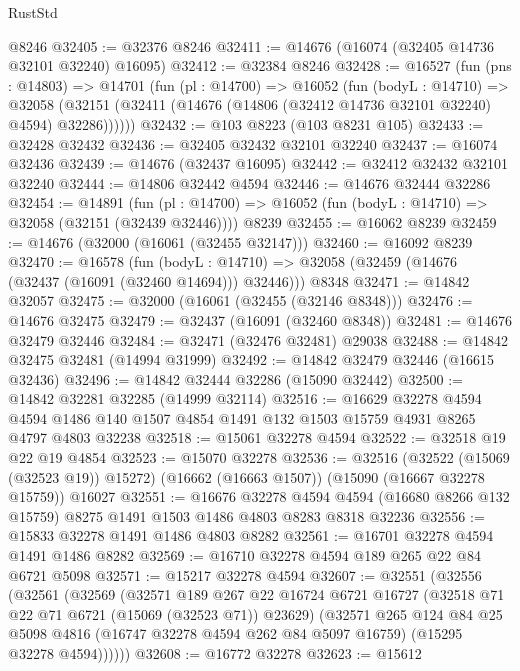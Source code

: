 \begin{lexlean}{RustStd}
\begin{coremodule}
    @8246
@32405 := @32376 @8246
@32411 := @14676 (@16074 (@32405 @14736 @32101 @32240) @16095)
@32412 := @32384 @8246
@32428 := @16527
    (fun (pns : @14803) =>
    @14701
      (fun (pl : @14700) =>
      @16052
        (fun (bodyL : @14710) =>
        @32058 (@32151 (@32411 (@14676 (@14806 (@32412 @14736 @32101 @32240) @4594) @32286))))))
@32432 := @103 @8223 (@103 @8231 @105)
@32433 := @32428 @32432
@32436 := @32405 @32432 @32101 @32240
@32437 := @16074 @32436
@32439 := @14676 (@32437 @16095)
@32442 := @32412 @32432 @32101 @32240
@32444 := @14806 @32442 @4594
@32446 := @14676 @32444 @32286
@32454 := @14891
    (fun (pl : @14700) => @16052 (fun (bodyL : @14710) => @32058 (@32151 (@32439 @32446))))
    @8239
@32455 := @16062 @8239
@32459 := @14676 (@32000 (@16061 (@32455 @32147)))
@32460 := @16092 @8239
@32470 := @16578
    (fun (bodyL : @14710) => @32058 (@32459 (@14676 (@32437 (@16091 (@32460 @14694))) @32446)))
    @8348
@32471 := @14842 @32057
@32475 := @32000 (@16061 (@32455 (@32146 @8348)))
@32476 := @14676 @32475
@32479 := @32437 (@16091 (@32460 @8348))
@32481 := @14676 @32479 @32446
@32484 := @32471 (@32476 @32481) @29038
@32488 := @14842 @32475 @32481 (@14994 @31999)
@32492 := @14842 @32479 @32446 (@16615 @32436)
@32496 := @14842 @32444 @32286 (@15090 @32442)
@32500 := @14842 @32281 @32285 (@14999 @32114)
@32516 := @16629
    @32278
    @4594
    @4594
    @1486
    @140
    @1507
    @4854
    @1491
    @132
    @1503
    @15759
    @4931
    @8265
    @4797
    @4803
    @32238
@32518 := @15061 @32278 @4594
@32522 := @32518 @19 @22 @19 @4854
@32523 := @15070 @32278
@32536 := @32516
    (@32522 (@15069 (@32523 @19)) @15272)
    (@16662 (@16663 @1507))
    (@15090 (@16667 @32278 @15759))
    @16027
@32551 := @16676
    @32278
    @4594
    @4594
    (@16680 @8266 @132 @15759)
    @8275
    @1491
    @1503
    @1486
    @4803
    @8283
    @8318
    @32236
@32556 := @15833 @32278 @1491 @1486 @4803 @8282
@32561 := @16701 @32278 @4594 @1491 @1486 @8282
@32569 := @16710 @32278 @4594 @189 @265 @22 @84 @6721 @5098
@32571 := @15217 @32278 @4594
@32607 := @32551
    (@32556
      (@32561
        (@32569
          (@32571
            @189
            @267
            @22
            @16724
            @6721
            @16727
            (@32518 @71 @22 @71 @6721 (@15069 (@32523 @71)) @23629)
            (@32571
              @265
              @124
              @84
              @25
              @5098
              @4816
              (@16747 @32278 @4594 @262 @84 @5097 @16759)
              (@15295 @32278 @4594))))))
@32608 := @16772 @32278
@32623 := @15612

\end{coremodule}
\end{lexlean}

